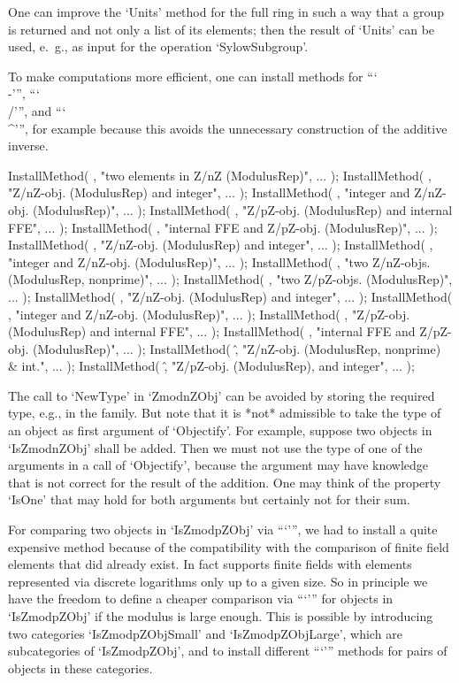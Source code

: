 One can improve the `Units' method for the full ring in such a way
that a group is returned and not only a list of its elements;
then the result of `Units' can be used, e.~g., as input for the operation
`SylowSubgroup'.

To make computations more efficient,
one can install methods for ```\\-''', ```\\/''', and ```\\^''',
for example because this avoids the unnecessary construction of the
additive inverse.

\begintt
    InstallMethod( \-, "two elements in Z/nZ (ModulusRep)", ... );
    InstallMethod( \-, "Z/nZ-obj. (ModulusRep) and integer", ... );
    InstallMethod( \-, "integer and Z/nZ-obj. (ModulusRep)", ... );
    InstallMethod( \-, "Z/pZ-obj. (ModulusRep) and internal FFE", ... );
    InstallMethod( \-, "internal FFE and Z/pZ-obj. (ModulusRep)", ... );
    InstallMethod( \*, "Z/nZ-obj. (ModulusRep) and integer", ... );
    InstallMethod( \*, "integer and Z/nZ-obj. (ModulusRep)", ... );
    InstallMethod( \/, "two Z/nZ-objs. (ModulusRep, nonprime)", ... );
    InstallMethod( \/, "two Z/pZ-objs. (ModulusRep)", ... );
    InstallMethod( \/, "Z/nZ-obj. (ModulusRep) and integer", ... );
    InstallMethod( \/, "integer and Z/nZ-obj. (ModulusRep)", ... );
    InstallMethod( \/, "Z/pZ-obj. (ModulusRep) and internal FFE", ... );
    InstallMethod( \/, "internal FFE and Z/pZ-obj. (ModulusRep)", ... );
    InstallMethod( \^, "Z/nZ-obj. (ModulusRep, nonprime) & int.", ... );
    InstallMethod( \^, "Z/pZ-obj. (ModulusRep), and integer", ... );
\endtt

The call to `NewType' in `ZmodnZObj' can be avoided by storing
the required type, e.g., in the family.
But note that it is *not* admissible to take the type of an object
as first argument of `Objectify'.
For example, suppose two objects in `IsZmodnZObj' shall be added.
Then we must not use the type of one of the arguments in a call of
`Objectify', because the argument may have knowledge that is not
correct for the result of the addition.
One may think of the property `IsOne' that may hold for both
arguments but certainly not for their sum.

For comparing two objects in `IsZmodpZObj' via ```\<''',
we had to install a quite expensive method because of the compatibility
with the comparison of finite field elements that did already exist.
In fact {\GAP} supports finite fields with elements represented via
discrete logarithms only up to a given size.
So in principle we have the freedom to define a cheaper comparison
via ```\<''' for objects in `IsZmodpZObj' if the modulus is large
enough.
This is possible by introducing two categories `IsZmodpZObjSmall'
and `IsZmodpZObjLarge', which are subcategories of `IsZmodpZObj',
and to install different ```\<''' methods for pairs of objects
in these categories.



